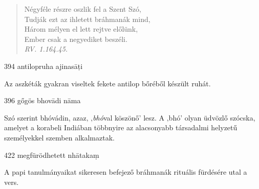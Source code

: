 \begin{notesdescription}
\begin{verse}
Négyféle részre oszlik fel a Szent Szó,\\
Tudják ezt az ihletett bráhmanák mind,\\
Három mélyen el lett rejtve előlünk,\\
Ember csak a negyediket beszéli.\\[0.5\baselineskip]
{\small\textit{RV. 1.164.45.}}
\end{verse}



\item[{394}
{antilopruha}
{ajinasāṭi}] \hfill\par

Az aszkéták gyakran viseltek fekete antilop bőréből készült ruhát.

\item[{396}
{gőgös}
{bhovādi nāma}] \hfill\par

Szó szerint bhóvádin, azaz‚ ‚\textit{bhó}val köszönő’ lesz. A ‚bhó’ olyan üdvözlő szócska, amelyet a korabeli Indiában többnyire az alacsonyabb társadalmi helyzetű személyekkel szemben alkalmaztak.

\item[{422}
{megfürödhetett}
{nhātakaṃ}] \hfill\par

A papi tanulmányaikat sikeresen befejező bráhmanák rituális fürdésére utal a vers.

\end{notesdescription}

